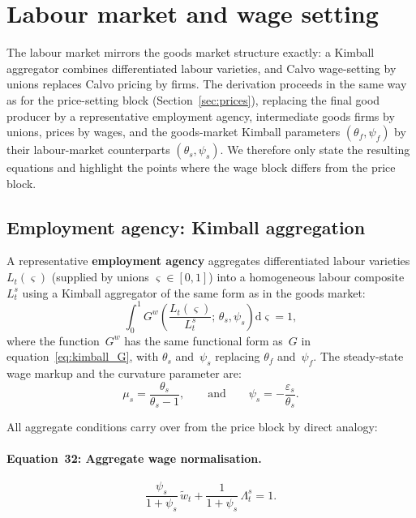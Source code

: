 \documentclass[11pt,a4paper]{article}
\newcommand{\dd}{\mathrm{d}}
\begin{document}
\section{Labour market and wage setting}
\label{sec:wages}

The labour market mirrors the goods market structure exactly: a Kimball
aggregator combines differentiated labour varieties, and Calvo
wage-setting by unions replaces Calvo pricing by firms.  The derivation
proceeds in the same way as for the price-setting block
(Section~\ref{sec:prices}), replacing the final good producer by a
representative employment agency, intermediate goods firms by unions,
prices by wages, and the goods-market Kimball parameters
$(\theta_f,\psi_f)$ by their labour-market counterparts
$(\theta_s,\psi_s)$.  We therefore only state the resulting equations
and highlight the points where the wage block differs from the price
block.

\subsection{Employment agency: Kimball aggregation}

A representative \textbf{employment agency} aggregates differentiated
labour varieties $L_t(\varsigma)$ (supplied by unions $\varsigma\in[0,1]$) into a
homogeneous labour composite $L^s_t$ using a Kimball aggregator of the
same form as in the goods market:
\begin{equation}
  \int_0^1 G^w\!\left(\frac{L_t(\varsigma)}{L^s_t};\,\theta_s,\psi_s\right)\dd\varsigma = 1,
\end{equation}
where the function~$G^w$ has the same functional form as~$G$ in
equation~\eqref{eq:kimball_G}, with $\theta_s$ and~$\psi_s$ replacing
$\theta_f$ and~$\psi_f$.  The steady-state wage markup and the
curvature parameter are:
\begin{equation}
  \mu_s = \frac{\theta_s}{\theta_s - 1},
  \qquad\text{and}\qquad
  \psi_s = -\frac{\varepsilon_s}{\theta_s}.
\end{equation}

All aggregate conditions carry over from the price block by direct
analogy:

\paragraph{Equation~32: Aggregate wage normalisation.}
\begin{equation}\label{eq:eq32}\tag{Eq.~32}
  \boxed{
  \frac{\psi_s}{1+\psi_s}\,\tilde w_t + \frac{1}{1+\psi_s}\,\Lambda^s_t = 1.}
\end{equation}
\end{document}
